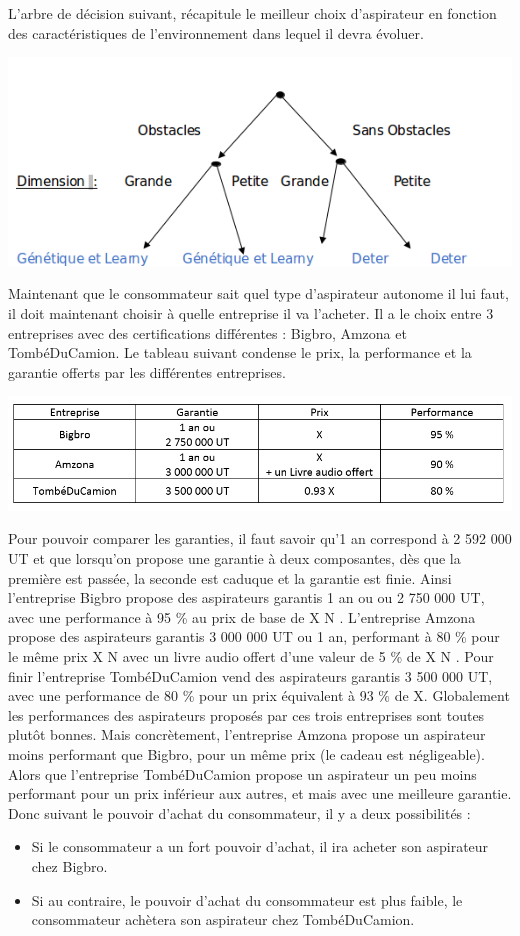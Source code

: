 \documentclass[12pt]{article}
\begin{document}
\justify
L'arbre de décision suivant, récapitule le meilleur choix d'aspirateur en fonction des caractéristiques de l'environnement dans lequel il devra évoluer. 
\begin{center}
	\includegraphics[scale=0.5]{1}
\end{center}
\justify
Maintenant que le consommateur sait quel type d'aspirateur autonome il lui faut, il doit maintenant choisir à quelle entreprise il va l'acheter. Il a le choix entre 3 entreprises avec des certifications différentes : Bigbro, Amzona et TombéDuCamion. Le tableau suivant condense le prix, la performance et la garantie offerts par les différentes entreprises. 
\begin{center}
	\includegraphics[scale=0.85]{ConsomEntreprise}
\end{center}
\justify
Pour pouvoir comparer les garanties, il faut savoir qu'1 an correspond à 2 592 000 UT et que lorsqu'on propose une garantie à deux composantes, dès que la première est passée, la seconde est caduque et la garantie est finie. 
\justify
Ainsi l'entreprise Bigbro propose des aspirateurs garantis 1 an ou ou 2 750 000 UT, avec une performance à 95 \% au prix de base de X N .
\justify
L'entreprise Amzona propose des aspirateurs garantis 3 000 000 UT ou 1 an, performant à 80 \% pour le même prix X N avec un livre audio offert d'une valeur de 5 \% de X N .
Pour finir l'entreprise TombéDuCamion vend des aspirateurs garantis 3 500 000 UT, avec une performance de 80 \% pour un prix équivalent à 93 \% de X. 
\justify
Globalement les performances des aspirateurs proposés par ces trois entreprises sont toutes plutôt bonnes. Mais concrètement, l'entreprise Amzona propose un aspirateur moins performant que Bigbro, pour un même prix (le cadeau est négligeable). Alors que l'entreprise TombéDuCamion propose un aspirateur un peu moins performant pour un prix inférieur aux autres, et mais avec une meilleure garantie.
\justify
Donc suivant le pouvoir d'achat du consommateur, il y a deux possibilités : 
\begin{itemize}
\item Si le consommateur a un fort pouvoir d'achat, il ira acheter son aspirateur chez Bigbro.
\item Si au contraire, le pouvoir d'achat du consommateur est plus faible, le consommateur achètera son aspirateur chez TombéDuCamion.
\end{itemize}
\clearpage
\end{document}
